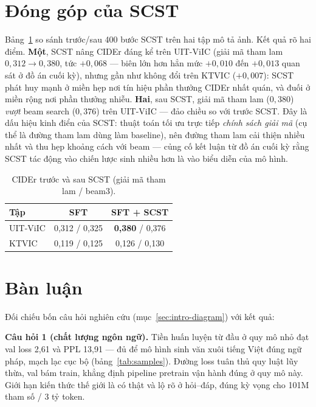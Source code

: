 \section{Đóng góp của SCST}
\label{sec:exp-scst}

Bảng~\ref{tab:scst} so sánh trước/sau 400 bước SCST trên hai tập mô tả ảnh.
Kết quả rõ hai điểm. \textbf{Một}, SCST nâng CIDEr đáng kể trên UIT-ViIC
(giải mã tham lam $0{,}312 \to 0{,}380$, tức $+0{,}068$ --- biên lớn hơn hẳn
mức $+0{,}010$ đến $+0{,}013$ quan sát ở đồ án cuối kỳ), nhưng gần như không
đổi trên KTVIC ($+0{,}007$): SCST phát huy mạnh ở miền hẹp nơi tín hiệu phần
thưởng CIDEr nhất quán, và đuối ở miền rộng nơi phần thưởng nhiễu.
\textbf{Hai}, sau SCST, giải mã tham lam ($0{,}380$) \emph{vượt} beam search
($0{,}376$) trên UIT-ViIC --- đảo chiều so với trước SCST. Đây là dấu hiệu
kinh điển của SCST: thuật toán tối ưu trực tiếp \emph{chính sách giải mã} (cụ
thể là đường tham lam dùng làm baseline), nên đường tham lam cải thiện nhiều
nhất và thu hẹp khoảng cách với beam --- củng cố kết luận từ đồ án cuối kỳ
rằng SCST tác động vào chiến lược sinh nhiều hơn là vào biểu diễn của mô hình.

\begin{table}[H]
	\centering
	\caption{CIDEr trước và sau SCST (giải mã tham lam / beam3).}
	\label{tab:scst}
	\begin{tabular}{lcc}
		\hline
		\textbf{Tập} & \textbf{SFT} & \textbf{SFT + SCST} \\
		\hline
		UIT-ViIC & 0,312 / 0,325 & \textbf{0,380} / 0,376 \\
		KTVIC & 0,119 / 0,125 & 0,126 / 0,130 \\
		\hline
	\end{tabular}
\end{table}

\section{Bàn luận}
\label{sec:exp-discussion}

Đối chiếu bốn câu hỏi nghiên cứu (mục~\ref{sec:intro-diagram}) với kết quả:

\textbf{Câu hỏi 1 (chất lượng ngôn ngữ).} Tiền huấn luyện từ đầu ở quy mô nhỏ
đạt val loss 2,61 và PPL 13,91 --- đủ để mô hình sinh văn xuôi tiếng Việt
đúng ngữ pháp, mạch lạc cục bộ (bảng~\ref{tab:samples}). Đường loss tuân thủ
quy luật lũy thừa, val bám train, khẳng định pipeline pretrain vận hành đúng
ở quy mô này. Giới hạn kiến thức thế giới là có thật và lộ rõ ở hỏi--đáp, đúng
kỳ vọng cho 101M tham số / 3 tỷ token.

